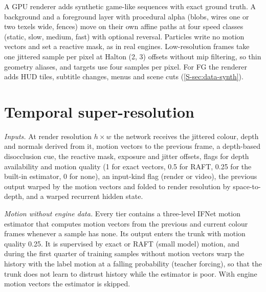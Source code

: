 \documentclass[pdflatex,sn-mathphys-num,iicol]{sn-jnl}
\begin{document}
A GPU renderer adds synthetic game-like sequences with exact ground truth. A background and a foreground layer with procedural alpha (blobs, wires one or two texels wide, fences) move on their own affine paths at four speed classes (static, slow, medium, fast) with optional reversal. Particles write no motion vectors and set a reactive mask, as in real engines. Low-resolution frames take one jittered sample per pixel at Halton (2, 3) offsets without mip filtering, so thin geometry aliases, and targets use four samples per pixel. For FG the renderer adds HUD tiles, subtitle changes, menus and scene cuts (\cref{S-sec:data-synth}).

\section{Temporal super-resolution}\label{sec:tsr}

\emph{Inputs.} At render resolution $h\times w$ the network receives the jittered colour, depth and normals derived from it, motion vectors to the previous frame, a depth-based disocclusion cue, the reactive mask, exposure and jitter offsets, flags for depth availability and motion quality (1 for exact vectors, 0.5 for RAFT, 0.25 for the built-in estimator, 0 for none), an input-kind flag (render or video), the previous output warped by the motion vectors and folded to render resolution by space-to-depth, and a warped recurrent hidden state.

\emph{Motion without engine data.} Every tier contains a three-level IFNet motion estimator \cite{huang2022rife} that computes motion vectors from the previous and current colour frames whenever a sample has none. Its output enters the trunk with motion quality 0.25. It is supervised by exact or RAFT (small model) \cite{teed2020raft} motion, and during the first quarter of training samples without motion vectors warp the history with the label motion at a falling probability (teacher forcing), so that the trunk does not learn to distrust history while the estimator is poor. With engine motion vectors the estimator is skipped.
\end{document}
